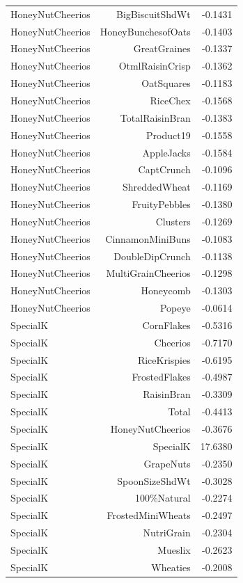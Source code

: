 \begin{longtable}{@{}lrr@{}}
HoneyNutCheerios & BigBiscuitShdWt & -0.1431 \\
HoneyNutCheerios & HoneyBunchesofOats & -0.1403 \\
HoneyNutCheerios & GreatGraines & -0.1337 \\
HoneyNutCheerios & OtmlRaisinCrisp & -0.1362 \\
HoneyNutCheerios & OatSquares & -0.1183 \\
HoneyNutCheerios & RiceChex & -0.1568 \\
HoneyNutCheerios & TotalRaisinBran & -0.1383 \\
HoneyNutCheerios & Product19 & -0.1558 \\
HoneyNutCheerios & AppleJacks & -0.1584 \\
HoneyNutCheerios & CaptCrunch & -0.1096 \\
HoneyNutCheerios & ShreddedWheat & -0.1169 \\
HoneyNutCheerios & FruityPebbles & -0.1380 \\
HoneyNutCheerios & Clusters & -0.1269 \\
HoneyNutCheerios & CinnamonMiniBuns & -0.1083 \\
HoneyNutCheerios & DoubleDipCrunch & -0.1138 \\
HoneyNutCheerios & MultiGrainCheerios & -0.1298 \\
HoneyNutCheerios & Honeycomb & -0.1303 \\
HoneyNutCheerios & Popeye & -0.0614 \\
SpecialK & CornFlakes & -0.5316 \\
SpecialK & Cheerios & -0.7170 \\
SpecialK & RiceKrispies & -0.6195 \\
SpecialK & FrostedFlakes & -0.4987 \\
SpecialK & RaisinBran & -0.3309 \\
SpecialK & Total & -0.4413 \\
SpecialK & HoneyNutCheerios & -0.3676 \\
SpecialK & SpecialK & 17.6380 \\
SpecialK & GrapeNuts & -0.2350 \\
SpecialK & SpoonSizeShdWt & -0.3028 \\
SpecialK & 100\%Natural & -0.2274 \\
SpecialK & FrostedMiniWheats & -0.2497 \\
SpecialK & NutriGrain & -0.2304 \\
SpecialK & Mueslix & -0.2623 \\
SpecialK & Wheaties & -0.2008 \\

\end{longtable}
